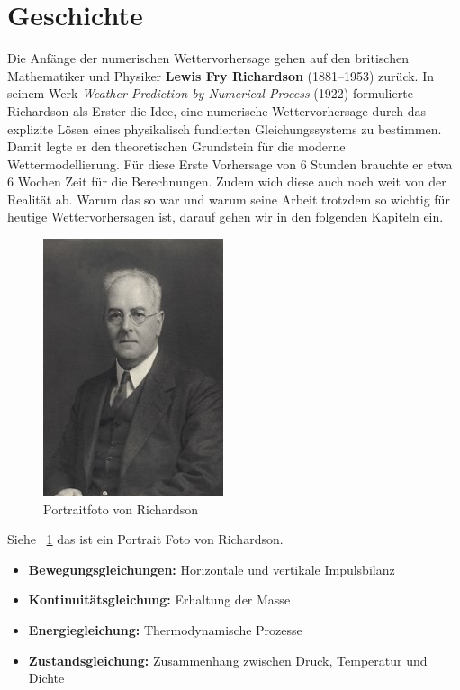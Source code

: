 %
%
%
%
\section{Geschichte\label{geostrophisch:section:geschichte}}

Die Anfänge der numerischen Wettervorhersage gehen auf den britischen Mathematiker und Physiker \textbf{Lewis Fry Richardson} (1881–1953) zurück.  
In seinem Werk \textit{Weather Prediction by Numerical Process} (1922) formulierte Richardson als Erster die Idee, eine numerische Wettervorhersage durch das explizite Lösen eines physikalisch fundierten Gleichungssystems zu bestimmen.  
Damit legte er den theoretischen Grundstein für die moderne Wettermodellierung.
Für diese Erste Vorhersage von 6 Stunden brauchte er etwa 6 Wochen Zeit für die Berechnungen.
Zudem wich diese auch noch weit von der Realität ab.
Warum das so war und warum seine Arbeit trotzdem so wichtig für heutige Wettervorhersagen ist, darauf gehen wir in den folgenden Kapiteln ein. 

\begin{figure}[h]
	\centering
	\includegraphics{Portrait_Richardson.jpg}
	\caption{Portraitfoto von Richardson}
	\label{bild:portraitRichi}
\end{figure}

Siehe ~\ref{bild:portraitRichi} das ist ein Portrait Foto von Richardson.

\begin{itemize}
	\item \textbf{Bewegungsgleichungen:} Horizontale und vertikale Impulsbilanz
	\item \textbf{Kontinuitätsgleichung:} Erhaltung der Masse
	\item \textbf{Energiegleichung:} Thermodynamische Prozesse
	\item \textbf{Zustandsgleichung:} Zusammenhang zwischen Druck, Temperatur und Dichte
\end{itemize}






